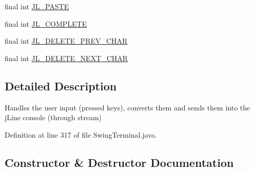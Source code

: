 \begin{DoxyCompactItemize}
final int \hyperlink{classgov_1_1nasa_1_1jpf_1_1inspector_1_1frontends_1_1jpfshell_1_1gui_1_1_swing_terminal_1_1_console_key_listener_a387add499ac1fff3098d155d351eb293}{J\+L\+\_\+\+P\+A\+S\+TE}
\item 
final int \hyperlink{classgov_1_1nasa_1_1jpf_1_1inspector_1_1frontends_1_1jpfshell_1_1gui_1_1_swing_terminal_1_1_console_key_listener_a9b960c4fda1d967fa3b47c185cb4b7cb}{J\+L\+\_\+\+C\+O\+M\+P\+L\+E\+TE}
\item 
final int \hyperlink{classgov_1_1nasa_1_1jpf_1_1inspector_1_1frontends_1_1jpfshell_1_1gui_1_1_swing_terminal_1_1_console_key_listener_ac8484b1c694ec1cd32e3e761a8cc1b20}{J\+L\+\_\+\+D\+E\+L\+E\+T\+E\+\_\+\+P\+R\+E\+V\+\_\+\+C\+H\+AR}
\item 
final int \hyperlink{classgov_1_1nasa_1_1jpf_1_1inspector_1_1frontends_1_1jpfshell_1_1gui_1_1_swing_terminal_1_1_console_key_listener_acfbea41dbd4f4a71882a22522de6afbf}{J\+L\+\_\+\+D\+E\+L\+E\+T\+E\+\_\+\+N\+E\+X\+T\+\_\+\+C\+H\+AR}
\end{DoxyCompactItemize}


\subsection{Detailed Description}
Handles the user input (pressed keys), converts them and sends them into the j\+Line console (through stream) 

Definition at line 317 of file Swing\+Terminal.\+java.



\subsection{Constructor \& Destructor Documentation}
